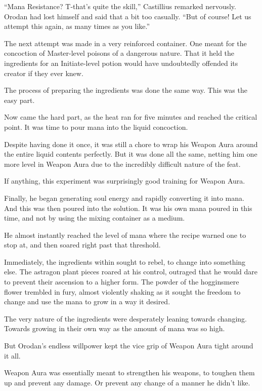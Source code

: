 \documentclass[a4paper,10pt]{book}
\begin{document}
“Mana Resistance? T-that’s quite the skill,” Castillius remarked nervously. Orodan had lost himself and said that a bit too casually. “But of course! Let us attempt this again, as many times as you like.”\par
The next attempt was made in a very reinforced container. One meant for the concoction of Master-level poisons of a dangerous nature. That it held the ingredients for an Initiate-level potion would have undoubtedly offended its creator if they ever knew.\par
The process of preparing the ingredients was done the same way. This was the easy part.\par
Now came the hard part, as the heat ran for five minutes and reached the critical point. It was time to pour mana into the liquid concoction.\par
Despite having done it once, it was still a chore to wrap his Weapon Aura around the entire liquid contents perfectly. But it was done all the same, netting him one more level in Weapon Aura due to the incredibly difficult nature of the feat.\par
If anything, this experiment was surprisingly good training for Weapon Aura.\par
Finally, he began generating soul energy and rapidly converting it into mana. And this was then poured into the solution. It was his own mana poured in this time, and not by using the mixing container as a medium.\par
He almost instantly reached the level of mana where the recipe warned one to stop at, and then soared right past that threshold.\par
Immediately, the ingredients within sought to rebel, to change into something else. The astragon plant pieces roared at his control, outraged that he would dare to prevent their ascension to a higher form. The powder of the hogginsmere flower trembled in fury, almost violently shaking as it sought the freedom to change and use the mana to grow in a way it desired.\par
The very nature of the ingredients were desperately leaning towards changing. Towards growing in their own way as the amount of mana was so high.\par
But Orodan’s endless willpower kept the vice grip of Weapon Aura tight around it all.\par
Weapon Aura was essentially meant to strengthen his weapons, to toughen them up and prevent any damage. Or prevent any change of a manner he didn’t like.\par
\end{document}
